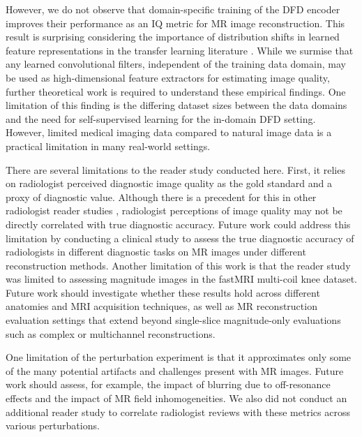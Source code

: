 \documentclass[AMA,STIX2COL,Linenumberson]{MRM}
\begin{document}
However, we do not observe that domain-specific training of the DFD encoder improves their performance as an IQ metric for MR image reconstruction. This result is surprising considering the importance of distribution shifts in learned feature representations in the transfer learning literature \cite{mei2022radimagenet, cadrin2022moving}. While we surmise that any learned convolutional filters, independent of the training data domain, may be used as high-dimensional feature extractors for estimating image quality, further theoretical work is required to understand these empirical findings. One limitation of this finding is the differing dataset sizes between the data domains and the need for self-supervised learning for the in-domain DFD setting. However, limited medical imaging data compared to natural image data is a practical limitation in many real-world settings.

There are several limitations to the reader study conducted here. First, it relies on radiologist perceived diagnostic image quality as the gold standard and a proxy of diagnostic value. Although there is a precedent for this in other radiologist reader studies \cite{mason2019comparison, kastryulin2023image}, radiologist perceptions of image quality may not be directly correlated with true diagnostic accuracy. Future work could address this limitation by conducting a clinical study to assess the true diagnostic accuracy of radiologists in different diagnostic tasks on MR images under different reconstruction methods. Another limitation of this work is that the reader study was limited to assessing magnitude images in the fastMRI multi-coil knee dataset. Future work should investigate whether these results hold across different anatomies and MRI acquisition techniques, as well as MR reconstruction evaluation settings that extend beyond single-slice magnitude-only evaluations such as complex or multichannel reconstructions. 

One limitation of the perturbation experiment is that it approximates only some of the many potential artifacts and challenges present with MR images. Future work should assess, for example, the impact of blurring due to off-resonance effects and the impact of MR field inhomogeneities. We also did not conduct an additional reader study to correlate radiologist reviews with these metrics across various perturbations.  
\end{document}

